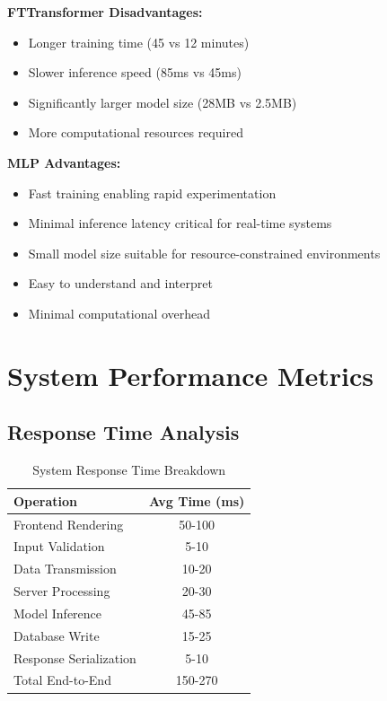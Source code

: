\documentclass[12pt,a4paper,twoside]{report}
\begin{document}
\textbf{FTTransformer Disadvantages:}

\begin{itemize}
    \item Longer training time (45 vs 12 minutes)
    \item Slower inference speed (85ms vs 45ms)
    \item Significantly larger model size (28MB vs 2.5MB)
    \item More computational resources required
\end{itemize}

\textbf{MLP Advantages:}

\begin{itemize}
    \item Fast training enabling rapid experimentation
    \item Minimal inference latency critical for real-time systems
    \item Small model size suitable for resource-constrained environments
    \item Easy to understand and interpret
    \item Minimal computational overhead
\end{itemize}

\section{System Performance Metrics}

\subsection{Response Time Analysis}

\begin{table}[H]
    \centering
    \begin{tabular}{|l|c|}
        \hline
        \textbf{Operation} & \textbf{Avg Time (ms)} \\
        \hline
        Frontend Rendering & 50-100 \\
        \hline
        Input Validation & 5-10 \\
        \hline
        Data Transmission & 10-20 \\
        \hline
        Server Processing & 20-30 \\
        \hline
        Model Inference & 45-85 \\
        \hline
        Database Write & 15-25 \\
        \hline
        Response Serialization & 5-10 \\
        \hline
        Total End-to-End & 150-270 \\
        \hline
    \end{tabular}
    \caption{System Response Time Breakdown}
\end{table}
\end{document}

